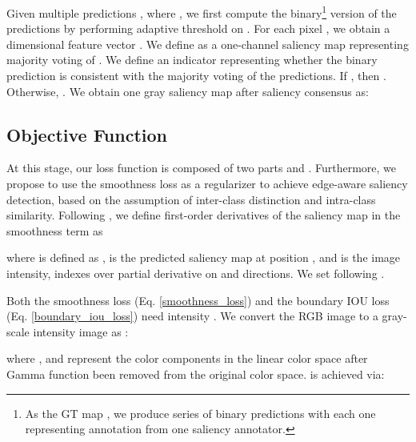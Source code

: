 \documentclass[10pt,twocolumn,letterpaper]{article}
\begin{document}
Given multiple predictions , where , we first compute the binary\footnote{As the GT map , we produce series of binary predictions with each one representing annotation from one saliency annotator.} version  of the predictions by performing adaptive threshold \cite{borji2015salient} on .
For each pixel , we obtain a  dimensional feature vector . We define  as a one-channel saliency map representing majority voting of .
We define an indicator  representing whether the binary prediction is consistent with the majority voting of the predictions. If , then . Otherwise, . We obtain one gray saliency map after saliency consensus as:



































\subsection{Objective Function} 
At this stage, our loss function is composed of two parts \ie  and . Furthermore, we propose to use the smoothness loss \cite{UnsupeGodard} as a regularizer to achieve edge-aware saliency detection, based on the assumption of inter-class distinction and intra-class similarity.
Following \cite{occlusion_aware}, we define first-order derivatives of the saliency map in the smoothness term as

where  is defined as ,
 is the predicted saliency map at position , and  is the image intensity,  indexes over partial derivative on  and  directions. We set  following \cite{occlusion_aware}.


Both the smoothness loss (Eq. \eqref{smoothness_loss}) and the boundary IOU loss (Eq. \eqref{boundary_iou_loss}) need intensity . We convert the RGB image  to a gray-scale intensity image  as \cite{Saliency_preserving_eccv}:

where ,  and  represent the color components in the linear color space after Gamma function been removed from the original color space.  is achieved via:
\end{document}
